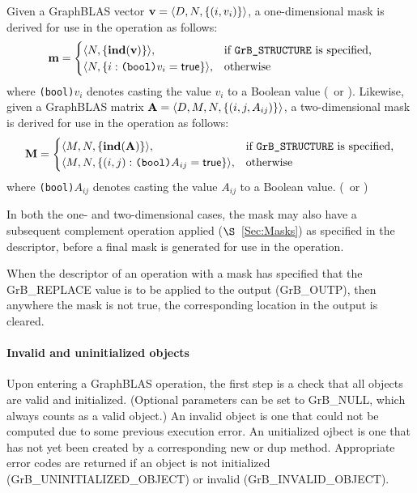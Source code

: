 Given a GraphBLAS vector ${\bf v} = \langle D,N, \{ (i,v_i) \} \rangle$, a
one-dimensional mask is derived for use in the operation as follows:
\[
{\bf m} = 
\begin{cases}
\langle N, \{ \mathbf{ind}({\bf v}) \} \rangle, & \mbox{if {\tt GrB\_STRUCTURE} is specified,} \\
\langle N, \{ i : \mbox{\tt (bool)}v_i = {\sf true} \} \rangle, & \mbox{otherwise}
\end{cases}
\]
where {\tt (bool)}$v_i$ denotes casting the value $v_i$ to a Boolean value (\true\ or \false).
Likewise, given a GraphBLAS matrix ${\bf A} = \langle D, M, N, \{ (i,j,A_{ij}) \} \rangle$,
a two-dimensional mask is derived for use in the operation as follows:
\[
{\bf M} = 
\begin{cases}
\langle M,N, \{ \mathbf{ind}({\bf A}) \} \rangle, & \mbox{if {\tt GrB\_STRUCTURE} is specified,} \\
\langle M,N, \{ (i,j) : \mbox{\tt (bool)}A_{ij} = {\sf true} \} \rangle, & \mbox{otherwise}
\end{cases}
\]
where {\tt (bool)}$A_{ij}$ denotes casting the value $A_{ij}$ to a Boolean value. 
(\true\ or \false)

In both the one- and two-dimensional cases, the mask may also have a subsequent 
complement operation applied ($\S$~\ref{Sec:Masks}) as specified in the 
descriptor, before a final mask is generated for use in the operation.

When the descriptor of an operation with a mask has specified that 
the {\sf GrB\_REPLACE} value is to be applied to the output ({\sf GrB\_OUTP}),
then anywhere the mask is not {\sf true}, the corresponding location in
the output is cleared.


\paragraph{Invalid and uninitialized objects}

Upon entering a GraphBLAS operation, the first step is a check that all
objects are valid and initialized. (Optional parameters can be set to {\sf
GrB\_NULL}, which always counts as a valid object.)  An invalid object is
one that could not be computed due to some previous execution error. An
unitialized ojbect is one that has not yet been created by a corresponding
{\sf new} or {\sf dup} method.  Appropriate error codes are returned if
an object is not initialized ({\sf GrB\_UNINITIALIZED\_OBJECT}) or invalid
({\sf GrB\_INVALID\_OBJECT}).

